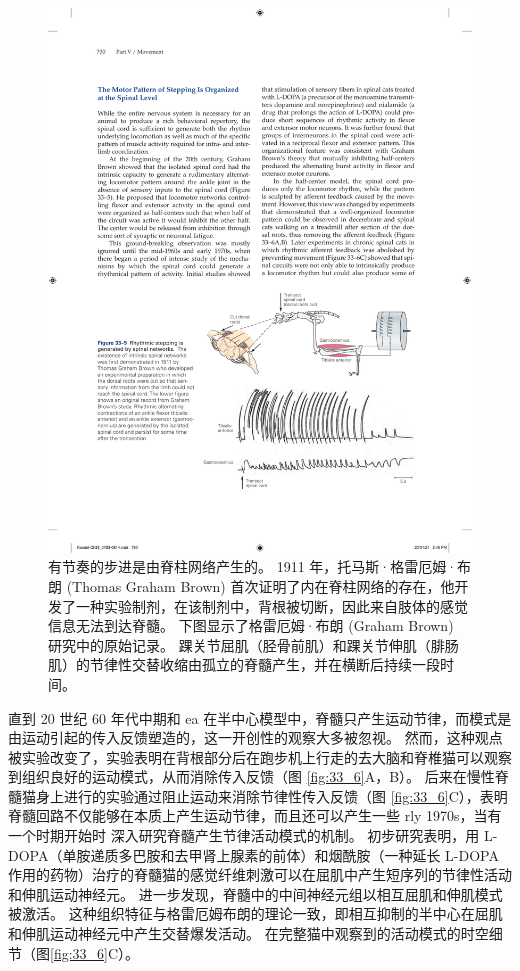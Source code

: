\begin{figure}[htbp]
	\centering
	\includegraphics[width=0.7\linewidth]{chap33/fig_33_5}
	\caption{有节奏的步进是由脊柱网络产生的。 1911 年，托马斯·格雷厄姆·布朗 (Thomas Graham Brown) 首次证明了内在脊柱网络的存在，他开发了一种实验制剂，在该制剂中，背根被切断，因此来自肢体的感觉信息无法到达脊髓。 下图显示了格雷厄姆·布朗 (Graham Brown) 研究中的原始记录。 踝关节屈肌（胫骨前肌）和踝关节伸肌（腓肠肌）的节律性交替收缩由孤立的脊髓产生，并在横断后持续一段时间。}
	\label{fig:33_5}
\end{figure}

直到 20 世纪 60 年代中期和 ea 在半中心模型中，脊髓只产生运动节律，而模式是由运动引起的传入反馈塑造的，这一开创性的观察大多被忽视。 
然而，这种观点被实验改变了，实验表明在背根部分后在跑步机上行走的去大脑和脊椎猫可以观察到组织良好的运动模式，从而消除传入反馈（图 \ref{fig:33_6}A，B）。 
后来在慢性脊髓猫身上进行的实验通过阻止运动来消除节律性传入反馈（图 \ref{fig:33_6}C），表明脊髓回路不仅能够在本质上产生运动节律，而且还可以产生一些 rly 1970s，当有一个时期开始时 深入研究脊髓产生节律活动模式的机制。
初步研究表明，用 L-DOPA（单胺递质多巴胺和去甲肾上腺素的前体）和烟酰胺（一种延长 L-DOPA 作用的药物）治疗的脊髓猫的感觉纤维刺激可以在屈肌中产生短序列的节律性活动 和伸肌运动神经元。
进一步发现，脊髓中的中间神经元组以相互屈肌和伸肌模式被激活。
这种组织特征与格雷厄姆布朗的理论一致，即相互抑制的半中心在屈肌和伸肌运动神经元中产生交替爆发活动。
在完整猫中观察到的活动模式的时空细节（图\ref{fig:33_6}C）。


